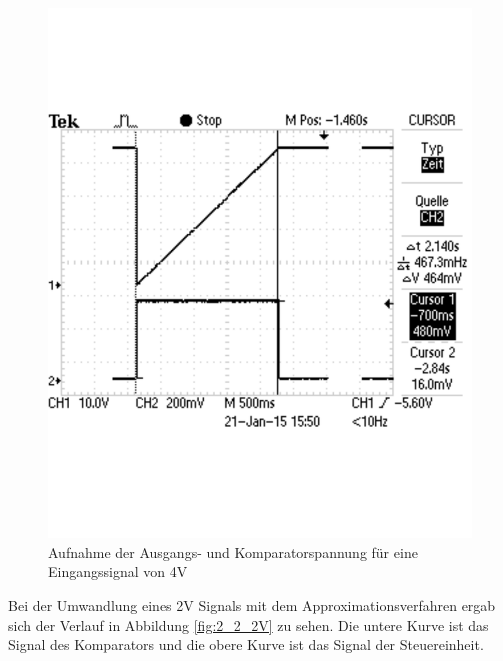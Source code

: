 \documentclass[12pt,a4paper]{article}
\begin{document}
\begin{figure}[H]
  \centering 	
    \includegraphics[trim = 0mm 50mm 0mm 50mm, clip, scale = 0.4]{2_1_2V.pdf}
  	\caption[Aufnahme der Ausgangs- und Komparatorspannung für eine Eingangssignal von 4V]{Aufnahme der Ausgangs- und Komparatorspannung für eine Eingangssignal von 4V} 
  \label{fig:2_1_2V}
\end{figure}

Bei der Umwandlung eines 2V Signals mit dem Approximationsverfahren ergab sich der Verlauf in Abbildung \ref{fig:2_2_2V} zu sehen. Die untere Kurve ist das Signal des Komparators und die obere Kurve ist das Signal der Steuereinheit.
\end{document}

